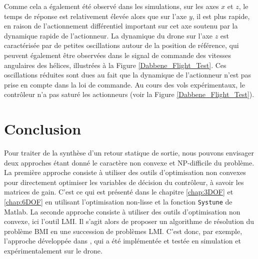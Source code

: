 Comme cela a également été observé dans les simulations, sur les axes $x$ et $z$, le temps de réponse est relativement élevée alors que sur l'axe $y$, il est plus rapide, en raison de l'actionnement différentiel important sur cet axe soutenu par la dynamique rapide de l'actionneur. 
 La dynamique du drone sur l'axe $z$ est caractérisée par de petites oscillations autour de la position de référence, qui peuvent également être observées dans le signal de commande des vitesses angulaires des hélices, illustrées à la Figure \ref{Dabbene_Flight_Test}. Ces oscillations réduites sont dues au fait que la dynamique de l'actionneur n'est pas prise en compte dans la loi de commande.
Au cours des vols expérimentaux, le contrôleur n'a pas saturé les actionneurs (voir la Figure \ref{Dabbene_Flight_Test}).



\section{Conclusion}

Pour traiter de la synthèse d'un retour statique de sortie, nous pouvons envisager deux approches étant donné le caractère non convexe et NP-difficile du problème. La première approche consiste à utiliser des outils d'optimisation non convexes pour directement optimiser les variables de décision du contrôleur, à savoir les matrices de gain. C'est ce qui est présenté dans le chapitre \ref{chap:3DOF} et \ref{chap:6DOF} en utilisant l'optimisation  non-lisse et la fonction {\tt Systune} de Matlab. La seconde approche consiste à utiliser des outils d'optimisation non convexe, ici l'outil LMI. Il s'agit alors de proposer un algorithme de résolution du problème BMI en une succession de problèmes LMI. C'est donc, par exemple, l'approche développée dans \cite{Arzelier2018}, qui a été implémentée et testée en simulation et expérimentalement sur le drone. 

